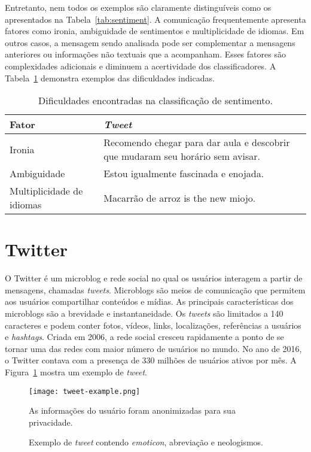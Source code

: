 Entretanto, nem todos os exemplos são claramente distinguíveis como os apresentados na Tabela~\ref{tab:sentiment}.
A comunicação frequentemente apresenta fatores como ironia, ambiguidade de sentimentos e multiplicidade de idiomas.
Em outros casos, a mensagem sendo analisada pode ser complementar a mensagens anteriores ou informações não textuais
que a acompanham.
Esses fatores são complexidades adicionais e diminuem a acertividade dos classificadores.
A Tabela~\ref{tab:sentiment_complexity} demonstra exemplos das dificuldades indicadas.

\begin{table}[h]
    \begin{center}
        \begin{tabular}{| l | p{10cm} |}
        \hline
        \textbf{Fator} & \textbf{\textit{Tweet}} \\ \hline
        Ironia & Recomendo chegar para dar aula e descobrir que mudaram seu horário sem avisar. \\ \hline
        Ambiguidade & Estou igualmente fascinada e enojada. \\ \hline
        Multiplicidade de idiomas & Macarrão de arroz is the new miojo. \\ \hline
        \end{tabular}
        \caption{Dificuldades encontradas na classificação de sentimento.}
        \label{tab:sentiment_complexity}
    \end{center}
\end{table}

\section{Twitter}

O Twitter é um microblog e rede social no qual os usuários interagem a partir de mensagens, chamadas \textit{tweets}.
Microblogs são meios de comunicação que permitem aos usuários compartilhar conteúdos e mídias.
As principais características dos microblogs são a brevidade e instantaneidade.
Os \textit{tweets} são limitados a 140 caracteres e podem conter fotos, vídeos, links, localizações, referências a
usuários e \textit{hashtags}.
Criada em 2006, a rede social cresceu rapidamente a ponto de se tornar uma das redes com maior número de usuários no
mundo.
No ano de 2016, o Twitter contava com a presença de 330 milhões de usuários ativos por mês.
A Figura~\ref{fig:tweet_ex} mostra um exemplo de \textit{tweet}.

\begin{figure}
\begin{center} {
    \begin{center}
    \texttt{[image: tweet-example.png]}
    \caption{Exemplo de \textit{tweet} contendo \textit{emoticon}, abreviação e neologismos.}
    \small{As informações do usuário foram anonimizadas para sua privacidade.}
    \label{fig:tweet_ex}
    \end{center}
}
\end{center}
\end{figure}

